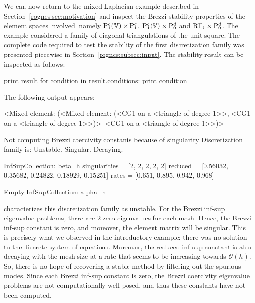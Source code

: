 We can now return to the mixed Laplacian example described in
Section~\ref{rognes:sec:motivation} and inspect the Brezzi stability
properties of the element spaces involved, namely
$\mathrm{P}^c_1(\mathbb{V}) \times \mathrm{P}^c_1$, $\mathrm{P}^c_1(\mathbb{V})
\times \mathrm{P}^d_0$ and $\mathrm{RT}_1 \times \mathrm{P}^d_0$. The
example considered a family of diagonal triangulations of the unit
square. The complete code required to test the stability of the first
discretization family was presented piecewise in
Section~\ref{rognes:subsec:input}. The stability result can be
inspected as follows:
\begin{python}
print result
for condition in result.conditions:
    print condition
\end{python}
The following output appears:
\begin{python}
<Mixed element: (<Mixed element: (<CG1 on a <triangle of degree 1>>,
<CG1 on a <triangle of degree 1>>)>, <CG1 on a <triangle of degree 1>>)>

Not computing Brezzi coercivity constants because of singularity
Discretization family is: Unstable. Singular. Decaying.

InfSupCollection: beta_h
singularities =  [2, 2, 2, 2, 2]
reduced =        [0.56032, 0.35682, 0.24822, 0.18929, 0.15251]
rates  =         [0.651, 0.895, 0.942, 0.968]

Empty InfSupCollection: alpha_h
\end{python}
\rognesascot{} characterizes this discretization family as
unstable. For the Brezzi inf-sup eigenvalue problems, there are 2 zero
eigenvalues for each mesh. Hence, the Brezzi inf-sup constant is zero,
and moreover, the element matrix will be singular. This is precisely
what we observed in the introductory example: there was no solution to
the discrete system of equations. Moreover, the reduced inf-sup
constant is also decaying with the mesh size at a rate that seems to
be increasing towards $\mathcal{O}(h)$. So, there is no hope of
recovering a stable method by filtering out the spurious modes. Since
each Brezzi inf-sup constant is zero, the Brezzi coercivity eigenvalue
problems are not computationally well-posed, and thus these constants
have not been computed.

